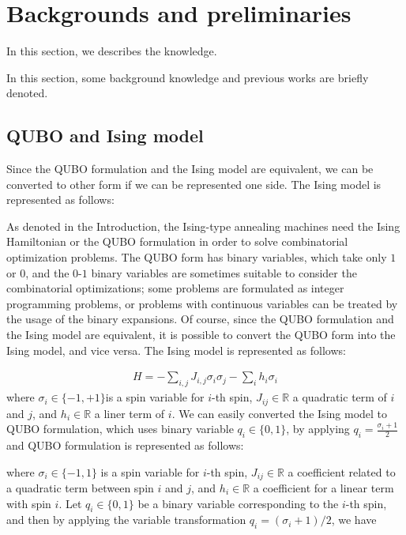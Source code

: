\documentclass[fp,twocolumn]{jpsj3}
\begin{document}
\section{Backgrounds and preliminaries}
In this section, we describes the knowledge.

In this section, some background knowledge and previous works are briefly denoted.


\subsection{QUBO and Ising model} %
Since the QUBO formulation and the Ising model are equivalent, we can be converted to other form if we can be represented one side. The Ising model is represented as follows:

As denoted in the Introduction, the Ising-type annealing machines need the Ising Hamiltonian or the QUBO formulation in order to solve combinatorial optimization problems. 
The QUBO form has binary variables, which take only $1$ or $0$, and the $0$-$1$ binary variables are sometimes suitable to consider the combinatorial optimizations; some problems are formulated as integer programming problems, or problems with continuous variables can be treated by the usage of the binary expansions. 
Of course, since the QUBO formulation and the Ising model are equivalent, it is possible to convert the QUBO form into the Ising model, and vice versa.
The Ising model is represented as follows:

\begin{eqnarray}
  H=-\sum_{i,j}{J_{i,j}\sigma_{i}\sigma_{j}}-\sum_{i}{h_{i}\sigma_{i}}
\end{eqnarray}
where $\sigma_{i}\in \{-1,+1\}$is a spin variable for $i$-th spin, $J_{ij}\in \mathbb{R}$ a quadratic term of $i$ and $j$, and $h_{i}\in \mathbb{R}$ a liner term of $i$. We can easily converted the Ising model to QUBO formulation, which uses binary variable $q_{i}\in \{0,1\}$, by applying $q_{i}=\frac{\sigma_{i}+1}{2}$ and QUBO formulation is represented as follows:

\noindent
where $\sigma_{i} \in \{-1,1\}$ is a spin variable for $i$-th spin, $J_{ij}\in\mathbb{R}$ a coefficient related to a quadratic term between spin $i$ and $j$, and $h_{i}\in\mathbb{R}$ a coefficient for a linear term with spin $i$.
Let $q_{i} \in \{0,1\}$ be a binary variable corresponding to the $i$-th spin,
and then by applying the variable transformation $q_{i}=(\sigma_{i}+1)/2$,
we have
\end{document}
